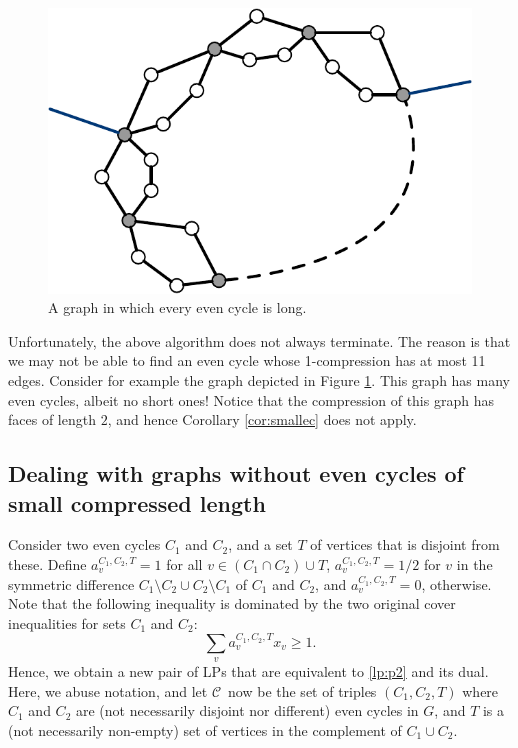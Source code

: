\documentclass{article}
\newcommand{\C}{\ensuremath{\mathcal{C}}}
\newcommand{\0}{\mathbb{0}}
\newcommand{\1}{\mathbb{1}}
\begin{document}
\begin{figure}
  \begin{center}
    \includegraphics[width=.3\textwidth]{longcyc.pdf}
  \end{center}
  \caption{\label{fig:longcyc} A graph in which every even cycle is long.}
\end{figure}

Unfortunately, the above algorithm does not always terminate. The
reason is that we may not be able to find an even cycle whose
1-compression has at most 11 edges. Consider for example the 
graph depicted in Figure \ref{fig:longcyc}. This graph has many even
cycles, albeit no short ones! Notice that the compression of this
graph has faces of length $2$, and hence Corollary \ref{cor:smallec}
does not apply. 

\subsection{Dealing with graphs without even cycles of small
  compressed length}

Consider two even cycles $C_1$ and $C_2$, and
a set $T$ of vertices that is disjoint from these. 
Define $a_v^{C_1,C_2,T}=1$
for all $v \in (C_1 \cap C_2) \cup T$, $a_v^{C_1,C_2,T}=1/2$ for
$v$ in the symmetric difference $C_1\setminus C_2 \cup C_2 \setminus C_1$
of $C_1$ and $C_2$, and
$a_v^{C_1,C_2,T}=0$, otherwise. Note that the following inequality is
dominated by the two original cover inequalities for
sets $C_1$ and $C_2$:
\[ \sum_{v} a^{C_1,C_2,T}_v x_v \geq 1. \]
Hence, we obtain a new
pair of LPs that are equivalent to \eqref{lp:p2} and its
dual. Here, we abuse notation, and let \C\ now be the set of triples $(C_1,C_2,T)$ where
$C_1$ and $C_2$ are (not necessarily disjoint nor different) 
even cycles in $G$, and $T$ is a (not necessarily non-empty) set
of vertices in the complement of $C_1 \cup C_2$. 

\medskip
\end{document}
